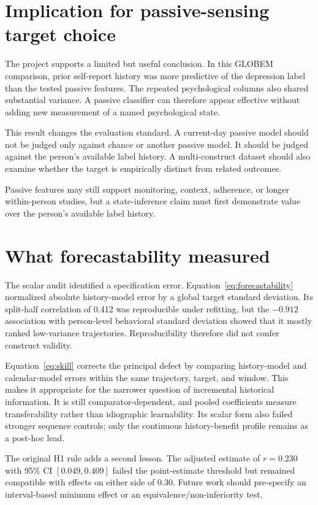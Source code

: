 \documentclass[a4paper,11pt,oneside]{report}
\begin{document}
\section{Implication for passive-sensing target choice}

The project supports a limited but useful conclusion. In this GLOBEM comparison,
prior self-report history was more predictive of the depression label than the
tested passive features. The repeated psychological columns also shared substantial
variance. A passive classifier can therefore appear effective without adding new
measurement of a named psychological state.

This result changes the evaluation standard. A current-day passive model should not
be judged only against chance or another passive model. It should be judged against
the person's available label history. A multi-construct dataset should also examine
whether the target is empirically distinct from related outcomes.

Passive features may still support monitoring, context, adherence, or longer
within-person studies, but a state-inference claim must first demonstrate value over
the person's available label history.

\section{What forecastability measured}

The scalar audit identified a specification error. Equation~\ref{eq:forecastability}
normalized absolute history-model error by a global target standard deviation. Its
split-half correlation of 0.412 was reproducible under refitting, but the $-0.912$
association with person-level behavioral standard deviation showed that it mostly
ranked low-variance trajectories. Reproducibility therefore did not confer construct
validity.

Equation~\ref{eq:skill} corrects the principal defect by comparing history-model and
calendar-model errors within the same trajectory, target, and window. This makes it
appropriate for the narrower question of incremental historical information. It is
still comparator-dependent, and pooled coefficients measure transferability rather
than idiographic learnability. Its scalar form also failed stronger sequence
controls; only the continuous history-benefit profile remains as a post-hoc lead.

The original H1 rule adds a second lesson. The adjusted estimate of $r=0.230$ with
95\% CI $[0.049,0.409]$ failed the point-estimate threshold but remained compatible
with effects on either side of 0.30. Future work should pre-specify an interval-based
minimum effect or an equivalence/non-inferiority test.
\end{document}
